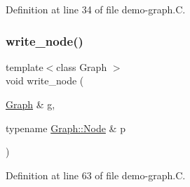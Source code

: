Definition at line 34 of file demo-\/graph.\+C.

\mbox{\label{demo-graph_8_c_abe260b66e94b606f11fd75beedd0f6dc}} 
\subsubsection{\texorpdfstring{write\+\_\+node()}{write\_node()}}
{\footnotesize\ttfamily template$<$class Graph $>$ \\
void write\+\_\+node (\begin{DoxyParamCaption}\item[{\hyperlink{class_designar_1_1_graph}{Graph} \&}]{g,  }\item[{typename \hyperlink{class_designar_1_1_graph_a5dfc7dba9d092ac489c72e40390c37d0}{Graph\+::\+Node} \&}]{p }\end{DoxyParamCaption})}



Definition at line 63 of file demo-\/graph.\+C.

